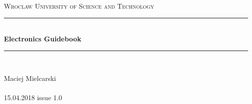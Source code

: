 \documentclass{article}
\begin{document}
\begin{titlepage} 
	\newcommand{\HRule}{\rule{\linewidth}{0.5mm}} 
	
	\center 
	
	
	\textsc{\LARGE Wroclaw University of Science and Technology}\\[1.5cm] %
	
	
	
	
	\HRule\\[0.4cm]
	
	{\huge\bfseries Electronics Guidebook}\\[0.4cm] %
	
	\HRule\\[1.5cm]
	
	

\vfill\vfill\vfill %
	
	{\large Maciej Mielcarski \\~\\15.04.2018 issue 1.0 } %
	
\end{titlepage}
\tableofcontents				%
\newpage
\end{document}

